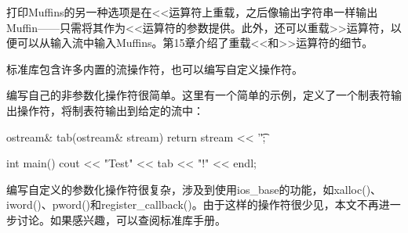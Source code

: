 打印Muffins的另一种选项是在<{}<运算符上重载，之后像输出字符串一样输出Muffin——只需将其作为<{}<运算符的参数提供。此外，还可以重载>{}>运算符，以便可以从输入流中输入Muffins。第15章介绍了重载<{}<和>{}>运算符的细节。


标准库包含许多内置的流操作符，也可以编写自定义操作符。

编写自己的非参数化操作符很简单。这里有一个简单的示例，定义了一个制表符输出操作符，将制表符输出到给定的流中：

\begin{cpp}
ostream& tab(ostream& stream) { return stream << '\t'; }

int main()
{
    cout << "Test" << tab << "!" << endl;
}
\end{cpp}

编写自定义的参数化操作符很复杂，涉及到使用ios\_base的功能，如xalloc()、iword()、pword()和register\_callback()。由于这样的操作符很少见，本文不再进一步讨论。如果感兴趣，可以查阅标准库手册。



